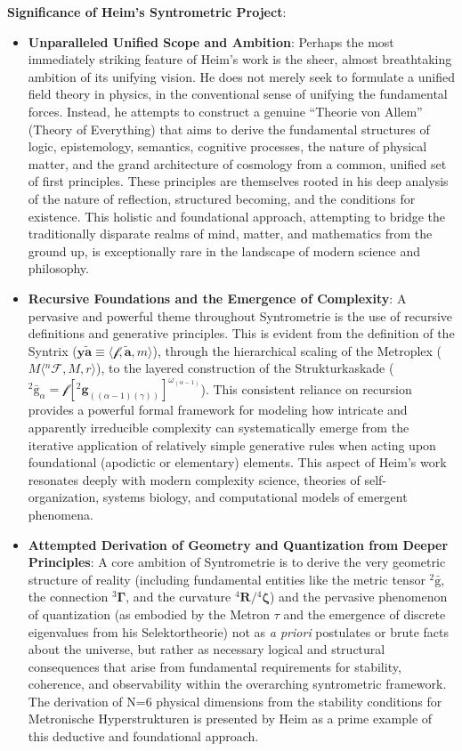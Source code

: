 \documentclass[12pt]{article}
\newcommand{\syntrix}{\bm{y\widetilde{a}}}
\newcommand{\metrophor}{\bm{\widetilde{a}}}
\newcommand{\synkolator}{\mathcal{f}}
\newcommand{\synkolationsstufe}{m}
\def\metroplex#1#2{M}%
\newcommand{\hypermetrophor}[1]{%
  \metroplex{#1}{a}%
}
\newcommand{\metroplexsynkolator}[1]{{}^{#1}\mathcal{F}}
\newcommand{\kompositionsfeld}{{}^2\bar{\mathrm{g}}}
\newcommand{\partialstruktur}[1]{{}^2\mathbf{g}_{(#1)}}
\newcommand{\fundamentalkondensor}{{}^3\bm{\Gamma}}
\newcommand{\metron}{\tau}
\newcommand{\strukturkompressor}{{}^4\bm{\zeta}}
\begin{document}
\textbf{Significance of Heim's Syntrometric Project}:
\begin{itemize}
    \item \textbf{Unparalleled Unified Scope and Ambition}: Perhaps the most immediately striking feature of Heim's work is the sheer, almost breathtaking ambition of its unifying vision. He does not merely seek to formulate a unified field theory in physics, in the conventional sense of unifying the fundamental forces. Instead, he attempts to construct a genuine \enquote{Theorie von Allem} (Theory of Everything) that aims to derive the fundamental structures of logic, epistemology, semantics, cognitive processes, the nature of physical matter, and the grand architecture of cosmology from a common, unified set of first principles. These principles are themselves rooted in his deep analysis of the nature of reflection, structured becoming, and the conditions for existence. This holistic and foundational approach, attempting to bridge the traditionally disparate realms of mind, matter, and mathematics from the ground up, is exceptionally rare in the landscape of modern science and philosophy.
    \item \textbf{Recursive Foundations and the Emergence of Complexity}: A pervasive and powerful theme throughout Syntrometrie is the use of recursive definitions and generative principles. This is evident from the definition of the Syntrix (\( \syntrix \equiv \langle \synkolator, \metrophor, \synkolationsstufe \rangle \)), through the hierarchical scaling of the Metroplex (\( \metroplex{n} \equiv \langle \metroplexsynkolator{n}, \hypermetrophor{n-1}, r \rangle \)), to the layered construction of the Strukturkaskade (\( \kompositionsfeld_\alpha = \mathcal{f}[\partialstruktur{(\alpha-1)(\gamma)}]^{\omega_{(\alpha-1)}} \)). This consistent reliance on recursion provides a powerful formal framework for modeling how intricate and apparently irreducible complexity can systematically emerge from the iterative application of relatively simple generative rules when acting upon foundational (apodictic or elementary) elements. This aspect of Heim's work resonates deeply with modern complexity science, theories of self-organization, systems biology, and computational models of emergent phenomena.
    \item \textbf{Attempted Derivation of Geometry and Quantization from Deeper Principles}: A core ambition of Syntrometrie is to derive the very geometric structure of reality (including fundamental entities like the metric tensor \( \kompositionsfeld \), the connection \( \fundamentalkondensor \), and the curvature \( {}^4\mathbf{R}/\strukturkompressor \)) and the pervasive phenomenon of quantization (as embodied by the Metron \( \metron \) and the emergence of discrete eigenvalues from his Selektortheorie) not as \textit{a priori} postulates or brute facts about the universe, but rather as necessary logical and structural consequences that arise from fundamental requirements for stability, coherence, and observability within the overarching syntrometric framework. The derivation of N=6 physical dimensions from the stability conditions for Metronische Hyperstrukturen is presented by Heim as a prime example of this deductive and foundational approach.

\end{itemize}
\end{document}
